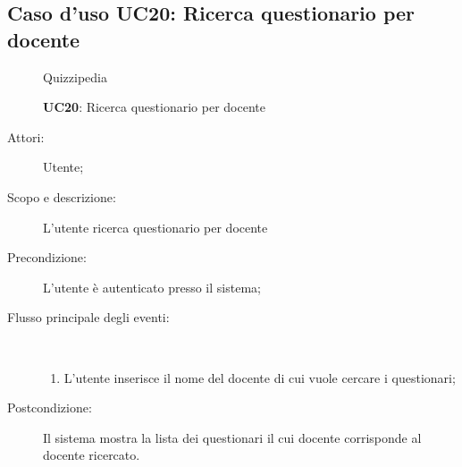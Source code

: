 \subsection{Caso d'uso UC20: Ricerca questionario per docente}
	\begin{figure}[H]
		\centering
		\begin{resizedtikzpicture}{\textwidth}
		\begin{umlsystem}[x=0, fill=lightgray!20]{Quizzipedia}
		\end{umlsystem}
		\end{resizedtikzpicture}
		\caption{\textbf{UC20}: Ricerca questionario per docente}
		\label{UC20}
	\end{figure}
\begin{description}
\item[Attori:] Utente;
\item[Scopo e descrizione:] L'utente ricerca questionario per docente
      \item[Precondizione:] L'utente è autenticato presso il sistema;

        \item[Flusso principale degli eventi:] \ 
 \begin{enumerate}
          \item L'utente inserisce il nome del docente di cui vuole cercare i questionari;

      \end{enumerate}
    \item[Postcondizione:] Il sistema mostra la lista dei questionari il cui docente corrisponde al docente ricercato.
  \end{description}
\hypertarget{UC21}{}
